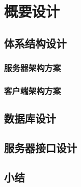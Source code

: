 \chapter{概要设计}

\section{体系结构设计}

\subsection{服务器架构方案}

\subsection{客户端架构方案}

\section{数据库设计}

\section{服务器接口设计}

\section{小结}

